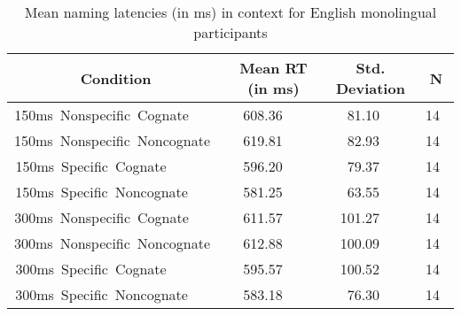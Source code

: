 \begin{table}[hptb]
\begin{center}
\begin{tabular}{|c|c|c|c|} \hline
\multicolumn{1}{|c|}{Condition}&\multicolumn{1}{c|}{Mean RT (in ms)}&\multicolumn{1}{c|}{Std. Deviation}&\multicolumn{1}{c|}{N}\\ \hline\hline
150ms~Nonspecific~Cognate~~~~&608.36~~~&~81.10~~~&14~\\ 
150ms~Nonspecific~Noncognate~&619.81~~~&~82.93~~~&14~\\ 
\hline
150ms~Specific~Cognate~~~~~~~&596.20~~~&~79.37~~~&14~\\ 
150ms~Specific~Noncognate~~~~&581.25~~~&~63.55~~~&14~\\ 
\hline\hline
300ms~Nonspecific~Cognate~~~~&611.57~~~&101.27~~~&14~\\ 
300ms~Nonspecific~Noncognate~&612.88~~~&100.09~~~&14~\\ 
\hline
300ms~Specific~Cognate~~~~~~~&595.57~~~&100.52~~~&14~\\ 
300ms~Specific~Noncognate~~~~&583.18~~~&~76.30~~~&14~\\ 
\hline
\end{tabular}
\caption{Mean naming latencies (in ms) in context for English monolingual participants}\label{emono_means}
\end{center}
\end{table}
